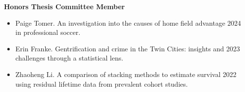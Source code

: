 \documentclass[margin]{res}
\begin{document}
\begin{resume}
\begin{itemize}
\end{itemize}

\textbf{Honors Thesis Committee Member}
\begin{itemize}

\item Paige Tomer.  An investigation into the causes of home field advantage \hfill 2024 \\ in professional soccer. 

\item Erin Franke. Gentrification and crime in the Twin Cities: insights and \hfill 2023 \\ challenges through a statistical lens. 

\item Zhaoheng Li. A comparison of stacking methods to estimate survival  \hfill 2022 \\ using residual lifetime data from prevalent cohort studies.  \\

\end{itemize}




\end{resume}
\end{document}
